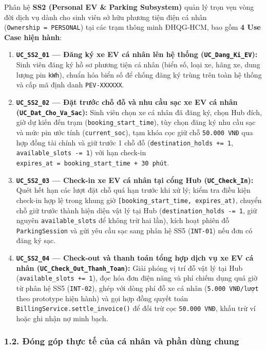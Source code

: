\documentclass[11pt,a4paper]{article}
\providecommand{\tightlist}{%
  \setlength{\itemsep}{0pt}\setlength{\parskip}{0pt}}
\begin{document}
Phân hệ \textbf{SS2 (Personal EV \& Parking Subsystem)} quản lý trọn vẹn
vòng đời dịch vụ dành cho sinh viên sở hữu phương tiện điện cá nhân
(\texttt{Ownership\ =\ PERSONAL}) tại các trạm thông minh ĐHQG-HCM, bao
gồm \textbf{4 Use Case hiện hành}:

\begin{enumerate}
\def\labelenumi{\arabic{enumi}.}
\tightlist
\item
  \textbf{\texttt{UC\_SS2\_01} --- Đăng ký xe EV cá nhân lên hệ thống
  (\texttt{UC\_Dang\_Ki\_EV}):} Sinh viên đăng ký hồ sơ phương tiện cá
  nhân (biển số, loại xe, hãng xe, dung lượng pin \texttt{kWh}), chuẩn
  hóa biển số để chống đăng ký trùng trên toàn hệ thống và cấp mã định
  danh \texttt{PEV-XXXXXX}.
\item
  \textbf{\texttt{UC\_SS2\_02} --- Đặt trước chỗ đỗ và nhu cầu sạc xe EV
  cá nhân (\texttt{UC\_Dat\_Cho\_Va\_Sac}):} Sinh viên chọn xe cá nhân
  đã đăng ký, chọn Hub đích, giờ dự kiến đến trạm
  (\texttt{booking\_start\_time}), tùy chọn đăng ký nhu cầu sạc và mức
  pin ước tính (\texttt{current\_soc}), tạm khóa cọc giữ chỗ
  \texttt{50.000\ VNĐ} qua hợp đồng tài chính và giữ trước 1 chỗ đỗ
  (\texttt{destination\_holds\ +=\ 1}, \texttt{available\_slots\ -=\ 1})
  với hạn check-in
  \texttt{expires\_at\ =\ booking\_start\_time\ +\ 30\ phút}.
\item
  \textbf{\texttt{UC\_SS2\_03} --- Check-in xe EV cá nhân tại cổng Hub
  (\texttt{UC\_Check\_In}):} Quét hết hạn các lượt đặt chỗ quá hạn trước
  khi xử lý; kiểm tra điều kiện check-in hợp lệ trong khung giờ
  \texttt{{[}booking\_start\_time,\ expires\_at)}, chuyển chỗ giữ trước
  thành hiện diện vật lý tại Hub (\texttt{destination\_holds\ -=\ 1},
  giữ nguyên \texttt{available\_slots} để không trừ hai lần), kích hoạt
  phiên đỗ \texttt{ParkingSession} và gửi yêu cầu sạc sang phân hệ SS5
  (\texttt{INT-01}) nếu đơn có đăng ký sạc.
\item
  \textbf{\texttt{UC\_SS2\_04} --- Check-out và thanh toán tổng hợp dịch
  vụ xe EV cá nhân (\texttt{UC\_Check\_Out\_Thanh\_Toan}):} Giải phóng
  vị trí đỗ vật lý tại Hub (\texttt{available\_slots\ +=\ 1}), đọc hóa
  đơn điện năng và phí chiếm dụng quá giờ từ phân hệ SS5
  (\texttt{INT-02}), ghép với dòng phí đỗ xe cá nhân
  (\texttt{5.000\ VNĐ/lượt} theo prototype hiện hành) và gọi hợp đồng
  quyết toán \texttt{BillingService.settle\_invoice()} để đối trừ cọc
  \texttt{50.000\ VNĐ}, khấu trừ ví hoặc ghi nhận nợ minh bạch.
\end{enumerate}

\hypertarget{ux111uxf3ng-guxf3p-thux1ef1c-tux1ebf-cux1ee7a-cuxe1-nhuxe2n-vuxe0-phux1ea7n-duxf9ng-chung}{%
\subsubsection{1.2. Đóng góp thực tế của cá nhân và phần dùng
chung}\label{ux111uxf3ng-guxf3p-thux1ef1c-tux1ebf-cux1ee7a-cuxe1-nhuxe2n-vuxe0-phux1ea7n-duxf9ng-chung}}
\end{document}
